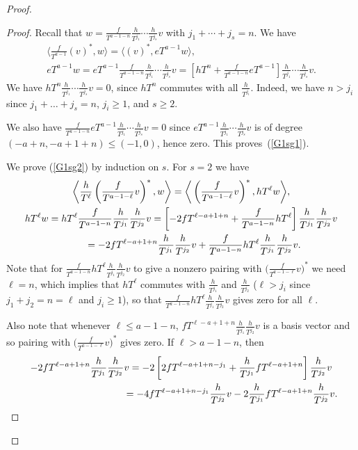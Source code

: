 \documentclass[pdftex]{sigma}
\numberwithin{equation}{section}
\begin{document}
\begin{proof}
\begin{proof}Recall that $w=\frac{f}{T^{a-1-n}}\frac{h}{T^{j_1}} \cdots \frac{h}{T^{j_s}} v$ with $j_1+\cdots+j_s=n$. We have
\begin{gather*}
\bigg\langle \frac{f}{T^{a-1}} (v)^*, w \bigg\rangle = \big\langle (v)^*, eT^{a-1} w \big\rangle, \\
eT^{a-1} w = eT^{a-1} \frac{f}{T^{a-1-n}}\frac{h}{T^{j_1}} \cdots \frac{h}{T^{j_s}} v = \left[ hT^n + \frac{f}{T^{a-1-n}} eT^{a-1} \right] \frac{h}{T^{j_1}} \cdots \frac{h}{T^{j_s}} v.
\end{gather*}
We have $hT^n \frac{h}{T^{j_1}} \cdots \frac{h}{T^{j_s}} v=0$, since $hT^n$ commutes with all $\frac{h}{T^{j_i}}$. Indeed, we have $n > j_i$ since $j_1 + \dots + j_s = n$, $j_i \geq 1$, and $s \geq 2$.

We also have $\frac{f}{T^{a-1-n}} eT^{a-1} \frac{h}{T^{j_1}} \cdots \frac{h}{T^{j_s}} v=0$ since $eT^{a-1} \frac{h}{T^{j_1}} \cdots \frac{h}{T^{j_s}}v$ is of degree $(-a+n, -a+1+n) \leq (-1, 0)$, hence zero. This proves~(\ref{G1sg1}).

We prove (\ref{G1sg2}) by induction on $s$. For $s=2$ we have
\begin{gather*}
\bigg\langle \frac{h}{T^{\ell}} \left(\frac{f}{T^{a-1-\ell}}v\right)^*, w \bigg\rangle = \bigg\langle \left(\frac{f}{T^{a-1-\ell}}v\right)^*, hT^{\ell} w \bigg\rangle, \\
hT^{\ell} w = hT^{\ell} \frac{f}{T^{a-1-n}}\frac{h}{T^{j_1}} \frac{h}{T^{j_2}} v = \left[ -2 fT^{\ell-a+1+n} + \frac{f}{T^{a-1-n}} hT^{\ell} \right] \frac{h}{T^{j_1}} \frac{h}{T^{j_2}} v \\
\hphantom{hT^{\ell} w}{} = -2 fT^{\ell-a+1+n} \frac{h}{T^{j_1}} \frac{h}{T^{j_2}} v + \frac{f}{T^{a-1-n}} hT^{\ell} \frac{h}{T^{j_1}} \frac{h}{T^{j_2}} v.
\end{gather*}
Note that for $ \frac{f}{T^{a-1-n}} hT^{\ell} \frac{h}{T^{j_1}} \frac{h}{T^{j_2}} v $ to give a nonzero pairing with $\big(\frac{f}{T^{a-1-\ell}}v\big)^*$ we need $\ell=n$, which implies that $hT^{\ell}$ commutes with $\frac{h}{T^{j_1}}$ and $\frac{h}{T^{j_2}}$ ($\ell > j_i$ since $j_1+j_2 =n=\ell$ and $j_i \geq 1$), so that $ \frac{f}{T^{a-1-n}} hT^{\ell} \frac{h}{T^{j_1}} \frac{h}{T^{j_2}} v $ gives zero for all $\ell$.

Also note that whenever $\ell \leq a-1-n$, $fT^{\ell-a+1+n} \frac{h}{T^{j_1}} \frac{h}{T^{j_2}} v$ is a basis vector and so pairing with $\big(\frac{f}{T^{a-1-\ell}}v\big)^*$ gives zero. If $\ell > a-1-n$, then
\begin{gather}
-2 fT^{\ell-a+1+n} \frac{h}{T^{j_1}} \frac{h}{T^{j_2}} v = -2 \left[ 2 fT^{\ell-a+1+n-j_1} + \frac{h}{T^{j_1}} fT^{\ell-a+1+n} \right] \frac{h}{T^{j_2}} v \nonumber \\
\hphantom{-2 fT^{\ell-a+1+n} \frac{h}{T^{j_1}} \frac{h}{T^{j_2}} v}{} = -4 fT^{\ell-a+1+n-j_1} \frac{h}{T^{j_2}} v -2 \frac{h}{T^{j_1}} fT^{\ell-a+1+n} \frac{h}{T^{j_2}} v. \label{1 and 2}
\end{gather}


\end{proof}
\end{proof}
\end{document}
